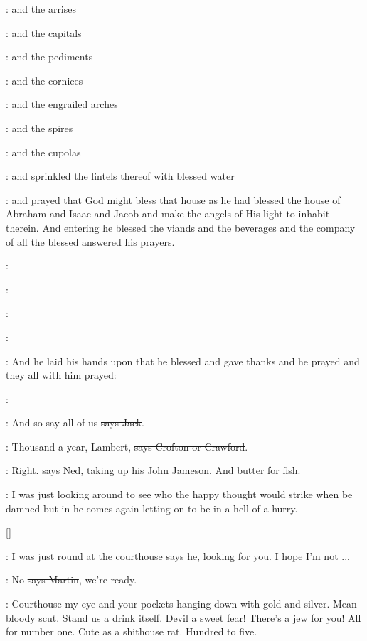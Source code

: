 :
and the arrises 

:
and the capitals 

:
and the pediments 

:
and the cornices 

:
and the engrailed arches 

:
and the spires 

:
and the cupolas 

:
and sprinkled the lintels thereof with blessed water

:
and prayed that God might bless that house as he had
blessed the house of Abraham and Isaac and Jacob and
make the angels of His light to inhabit therein.
And entering he blessed the viands and the beverages and the company of
all the blessed answered his prayers.

:

:

:

:

:
And he laid his hands upon that he blessed and gave thanks and he
prayed and they all with him prayed:

\All:

\power:
And so say all of us \sout{says Jack}.

\crofton:
Thousand a year, Lambert,
\sout{says Crofton or Crawford}.

\lambert:
Right. \sout{says Ned, taking up his John Jameson.}
And butter for fish.

\Nq:
I was just looking around to see who the happy thought would strike
when be damned but in he comes again letting on to be in a hell of a
hurry.

[]

\Bloom:
I was just round at the courthouse \sout{says he},
looking for you. I hope I'm
not ...

\cunningham:
No \sout{says Martin}, we're ready.

\Nq:
Courthouse my eye and your pockets hanging down with gold and silver.
Mean bloody scut. Stand us a drink itself.
Devil a sweet fear! There's
a jew for you! All for number one. Cute as a shithouse rat. Hundred to
five.

